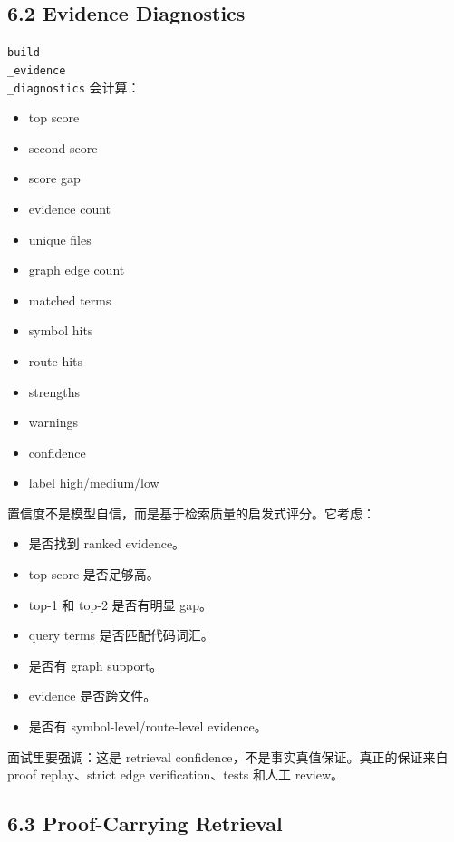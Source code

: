 \documentclass[UTF8,12pt,openany]{ctexbook}
\begin{document}
\subsection{6.2 Evidence Diagnostics}

\texttt{build\\_evidence\\_diagnostics} 会计算：\par

\begin{itemize}
\item top score
\item second score
\item score gap
\item evidence count
\item unique files
\item graph edge count
\item matched terms
\item symbol hits
\item route hits
\item strengths
\item warnings
\item confidence
\item label high/medium/low
\end{itemize}

置信度不是模型自信，而是基于检索质量的启发式评分。它考虑：\par

\begin{itemize}
\item 是否找到 ranked evidence。
\item top score 是否足够高。
\item top-1 和 top-2 是否有明显 gap。
\item query terms 是否匹配代码词汇。
\item 是否有 graph support。
\item evidence 是否跨文件。
\item 是否有 symbol-level/route-level evidence。
\end{itemize}

面试里要强调：这是 retrieval confidence，不是事实真值保证。真正的保证来自 proof replay、strict edge verification、tests 和人工 review。\par

\subsection{6.3 Proof-Carrying Retrieval}
\end{document}
